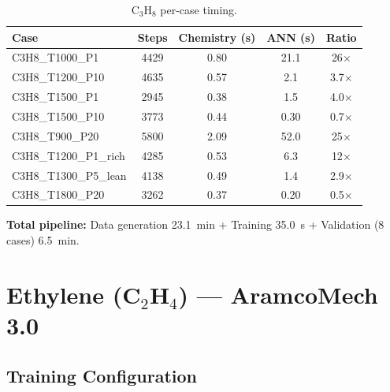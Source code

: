 \documentclass[11pt,a4paper]{article}
\begin{document}
\begin{table}[H]
\centering
\caption{C$_3$H$_8$ per-case timing.}
\label{tab:c3h8_timing}
\begin{tabular}{lcccc}
\toprule
\textbf{Case} & \textbf{Steps} & \textbf{Chemistry (s)} & \textbf{ANN (s)} & \textbf{Ratio} \\
\midrule
C3H8\_T1000\_P1 & 4429 & 0.80 & 21.1 & 26$\times$ \\
C3H8\_T1200\_P10 & 4635 & 0.57 & 2.1 & 3.7$\times$ \\
C3H8\_T1500\_P1 & 2945 & 0.38 & 1.5 & 4.0$\times$ \\
C3H8\_T1500\_P10 & 3773 & 0.44 & 0.30 & 0.7$\times$ \\
\midrule
C3H8\_T900\_P20 & 5800 & 2.09 & 52.0 & 25$\times$ \\
C3H8\_T1200\_P1\_rich & 4285 & 0.53 & 6.3 & 12$\times$ \\
C3H8\_T1300\_P5\_lean & 4138 & 0.49 & 1.4 & 2.9$\times$ \\
C3H8\_T1800\_P20 & 3262 & 0.37 & 0.20 & 0.5$\times$ \\
\bottomrule
\end{tabular}
\end{table}

\textbf{Total pipeline:} Data generation 23.1~min + Training 35.0~s + Validation (8 cases) 6.5~min.

\newpage
\section{Ethylene (C\texorpdfstring{$_2$}{2}H\texorpdfstring{$_4$}{4}) --- AramcoMech 3.0}
\label{sec:c2h4}

\subsection{Training Configuration}
\end{document}
